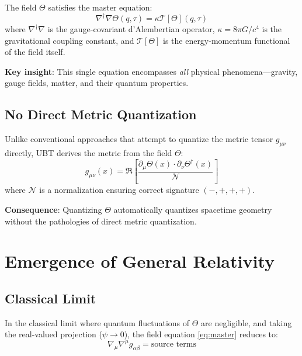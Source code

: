 \documentclass[12pt]{article}
\begin{document}
The field $\Theta$ satisfies the master equation:
\begin{equation}
    \nabla^\dagger \nabla \Theta(q,\tau) = \kappa \mathcal{T}[\Theta](q,\tau)
    \label{eq:master}
\end{equation}
where $\nabla^\dagger \nabla$ is the gauge-covariant d'Alembertian operator, $\kappa = 8\pi G/c^4$ is the gravitational coupling constant, and $\mathcal{T}[\Theta]$ is the energy-momentum functional of the field itself.

\textbf{Key insight}: This single equation encompasses \textit{all} physical phenomena—gravity, gauge fields, matter, and their quantum properties.

\subsection{No Direct Metric Quantization}

Unlike conventional approaches that attempt to quantize the metric tensor $g_{\mu\nu}$ directly, UBT derives the metric from the field $\Theta$:
\begin{equation}
    g_{\mu\nu}(x) = \Re\left[\frac{\partial_\mu \Theta(x) \cdot \partial_\nu \Theta^\dagger(x)}{\mathcal{N}}\right]
    \label{eq:metric_from_theta}
\end{equation}
where $\mathcal{N}$ is a normalization ensuring correct signature $(-, +, +, +)$.

\textbf{Consequence}: Quantizing $\Theta$ automatically quantizes spacetime geometry without the pathologies of direct metric quantization.

\section{Emergence of General Relativity}

\subsection{Classical Limit}

In the classical limit where quantum fluctuations of $\Theta$ are negligible, and taking the real-valued projection ($\psi \to 0$), the field equation \eqref{eq:master} reduces to:
\begin{equation}
    \nabla_\mu \nabla^\mu g_{\alpha\beta} = \text{source terms}
\end{equation}
\end{document}
